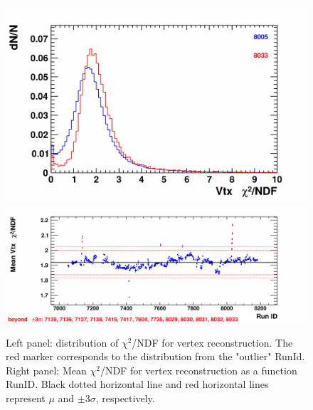     \begin{figure}[H]
        \begin{center}
            \includegraphics[width=0.35\linewidth]{../pict/QA_RunByRun_24.12/H1/nVtxTr_h2_RunId_vtx_chi2_ndf.png}
            \includegraphics[width=0.60\linewidth]{../pict/QA_RunByRun_24.12/nVtxTr_h2_RunId_vtx_chi2_ndf.png}
            \vspace{-3mm}
            \caption{Left panel: distribution of $\chi^2$/NDF for vertex reconstruction. The red marker corresponds to the distribution from the "outlier" RunId. Right panel: Mean $\chi^2$/NDF for vertex reconstruction as a function RunID. Black dotted horizontal line and red horizontal lines represent $\mu$ and $\pm3\sigma$, respectively.}
            \label{fig:VtxChiNdf}
        \end{center}
        \vspace{-5mm}
    \end{figure}


